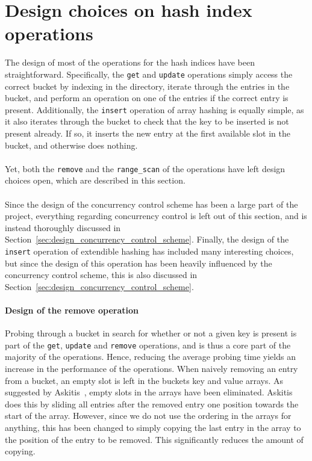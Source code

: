 \documentclass[11pt]{report} %
\begin{document}
\section{Design choices on hash index operations}
\label{sec:design_choices_on_hash_index_operations}
The design of most of the operations for the hash indices have been straightforward. Specifically, the \verb|get| and \verb|update| operations simply access the correct bucket by indexing in the directory, iterate through the entries in the bucket, and perform an operation on one of the entries if the correct entry is present. Additionally, the \verb|insert| operation of array hashing is equally simple, as it also iterates through the bucket to check that the key to be inserted is not present already. If so, it inserts the new entry at the first available slot in the bucket, and otherwise does nothing.\\
\\
Yet, both the \verb|remove| and the \verb|range_scan| of the operations have left design choices open, which are described in this section. \\
\\
Since the design of the concurrency control scheme has been a large part of the project, everything regarding concurrency control is left out of this section, and is instead thoroughly discussed in Section~\ref{sec:design_concurrency_control_scheme}. Finally, the design of the \verb|insert| operation of extendible hashing has included many interesting choices, but since the design of this operation has been heavily influenced by the concurrency control scheme, this is also discussed in Section~\ref{sec:design_concurrency_control_scheme}.
\paragraph{Design of the remove operation}
Probing through a bucket in search for whether or not a given key is present is part of the \verb|get|, \verb|update| and \verb|remove| operations, and is thus a core part of the majority of the operations. Hence, reducing the average probing time yields an increase in the performance of the operations. When naively removing an entry from a bucket, an empty slot is left in the buckets key and value arrays. As suggested by Askitis~\cite{NA09}, empty slots in the arrays have been eliminated. Askitis does this by sliding all entries after the removed entry one position towards the start of the array. However, since we do not use the ordering in the arrays for anything, this has been changed to simply copying the last entry in the array to the position of the entry to be removed. This significantly reduces the amount of copying.
\end{document}

